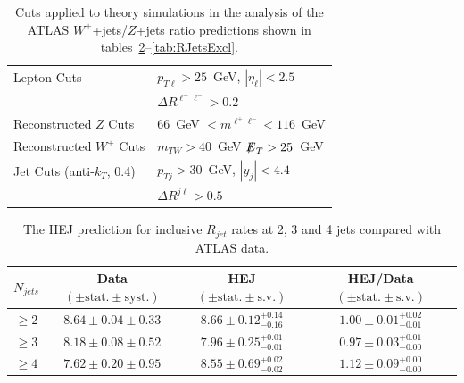 		\begin{table}[h]
		\centering
		\begin{tabular}{|l|l|}
			\hline
			Lepton Cuts & $p_{T\ell}>25$~GeV, \; $|\eta_\ell|<2.5$ \\
			&  $\Delta R^{\ell^+\ell^-} > 0.2$ \\ \hline
			Reconstructed $Z$ Cuts &  $66$~GeV $< m^{\ell^+\ell^-} <116$~GeV \\
			\hline
			Reconstructed $W^\pm$ Cuts & $m_{TW} > 40$~GeV\; $\slashed E_{T} > 25$~GeV \\ \hline
			Jet Cuts (anti-$k_T$, 0.4) & $p_{Tj}>30$~GeV, \; $|y_j|<4.4$ \\
			& $\Delta R^{j\ell} >0.5$ \\
			\hline
			\end{tabular}
			\caption{Cuts applied to theory simulations in the analysis of the ATLAS $W^\pm$+jets/$Z$+jets ratio
		  	predictions shown in tables~\ref{tab:RJetsIncl}--\ref{tab:RJetsExcl}.}
			\label{tab:atlasWZcuts}
		\end{table}

		\begin{table}[!h]
			\begin{center}
			\begin{tabular}{| c | c | c | c |}
		        \hline
			$N_{jets}$ & Data $(\pm \text{stat.}\pm \text{syst.})$ & HEJ $(\pm \text{stat.}\pm \text{s.v.})$ & HEJ/Data $(\pm \text{stat.}\pm \text{s.v.})$ \\ \hline
			$\ge2$ & $8.64\pm0.04\pm0.33$ & $8.66\pm0.12^{+0.14}_{-0.16}$ & $1.00\pm0.01^{+0.02}_{-0.01}$ \\ \hline
			$\ge3$ & $8.18\pm0.08\pm0.52$ & $7.96\pm0.25^{+0.01}_{-0.01}$ & $0.97\pm0.03^{+0.01}_{-0.00}$ \\ \hline
			$\ge4$ & $7.62\pm0.20\pm0.95$ & $8.55\pm0.69^{+0.02}_{-0.02}$ & $1.12\pm0.09^{+0.00}_{-0.00}$ \\ \hline
			\end{tabular}
			\caption{The HEJ prediction for inclusive $R_{jet}$ rates at 2, 3 and 4 jets compared with ATLAS data.}
			\label{tab:RJetsIncl}
			\end{center}
		\end{table}

